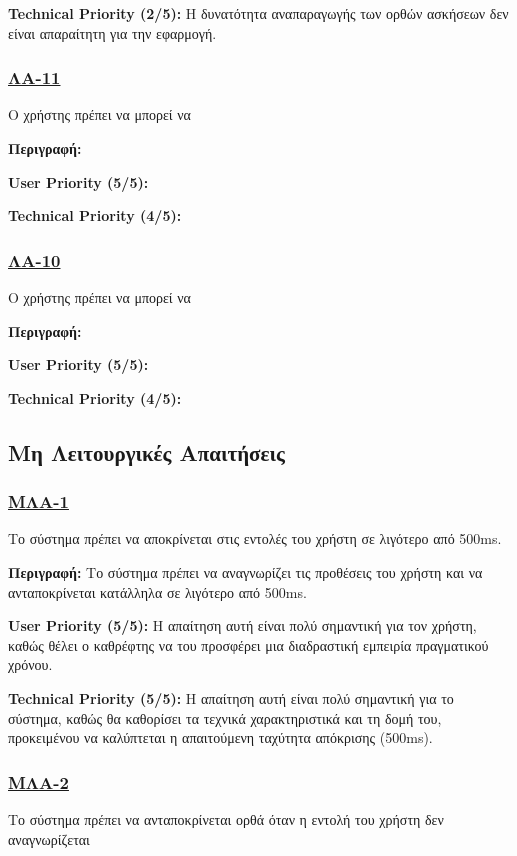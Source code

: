\noindent\textbf{Technical Priority (2/5):} Η δυνατότητα αναπαραγωγής των ορθών ασκήσεων δεν είναι απαραίτητη για την εφαρμογή.

\subsubsection{\underline{ΛΑ-11}}
\noindent Ο χρήστης πρέπει να μπορεί να

\noindent\textbf{Περιγραφή:}

\noindent\textbf{User Priority (5/5):}

\noindent\textbf{Technical Priority (4/5):}

\subsubsection{\underline{ΛΑ-10}}
\noindent Ο χρήστης πρέπει να μπορεί να

\noindent\textbf{Περιγραφή:}

\noindent\textbf{User Priority (5/5):}

\noindent\textbf{Technical Priority (4/5):}


\noindent\subsection{Μη Λειτουργικές Απαιτήσεις}

\subsubsection{\underline{ΜΛΑ-1}}
\noindent Το σύστημα πρέπει να αποκρίνεται στις εντολές του χρήστη σε λιγότερο από 500ms.

\noindent\textbf{Περιγραφή:} Το σύστημα πρέπει να αναγνωρίζει τις προθέσεις του χρήστη και να ανταποκρίνεται κατάλληλα σε λιγότερο από 500ms.

\noindent\textbf{User Priority (5/5):} Η απαίτηση αυτή είναι πολύ σημαντική για τον χρήστη, καθώς θέλει ο καθρέφτης να του προσφέρει μια διαδραστική εμπειρία πραγματικού χρόνου.

\noindent\textbf{Technical Priority (5/5):} Η απαίτηση αυτή είναι πολύ σημαντική για το σύστημα, καθώς θα καθορίσει τα τεχνικά χαρακτηριστικά και τη δομή του, προκειμένου να καλύπτεται η απαιτούμενη ταχύτητα απόκρισης (500ms).

\subsubsection{\underline{ΜΛΑ-2}}
\noindent Το σύστημα πρέπει να ανταποκρίνεται ορθά όταν η εντολή του χρήστη δεν αναγνωρίζεται

